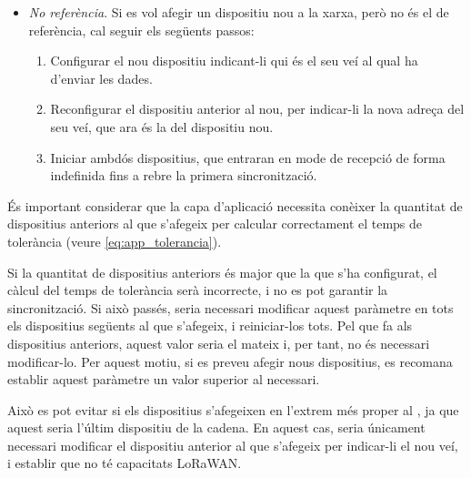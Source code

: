 \documentclass{tfgitic}[2024/07/01]
\begin{document}
{\begin{itemize}
    \item \emph{No referència}. Si es vol afegir un dispositiu nou a la xarxa, però no és el de referència, cal seguir els següents passos:
    \begin{enumerate}
        \item Configurar el nou dispositiu indicant-li qui és el seu veí al qual ha d'enviar les dades.
        \item Reconfigurar el dispositiu anterior al nou, per indicar-li la nova adreça del seu veí, que ara és la del dispositiu nou. 
        \item Iniciar ambdós dispositius, que entraran en mode de recepció de forma indefinida fins a rebre la primera sincronització. 
    \end{enumerate}
\end{itemize}

És important considerar que la capa d'aplicació necessita conèixer la quantitat de dispositius anteriors al que s'afegeix per calcular correctament el temps de tolerància (veure \autoref{eq:app_tolerancia}). 

Si la quantitat de dispositius anteriors és major que la que s'ha configurat, el càlcul del temps de tolerància serà incorrecte, i no es pot garantir la sincronització. Si això passés, seria necessari modificar aquest paràmetre en tots els dispositius següents al que s'afegeix, i reiniciar-los tots. Pel que fa als dispositius anteriors, aquest valor seria el mateix i, per tant, no és necessari modificar-lo. Per aquest motiu, si es preveu afegir nous dispositius, es recomana establir aquest paràmetre un valor superior al necessari.

Això es pot evitar si els dispositius s'afegeixen en l'extrem més proper al , ja que aquest seria l'últim dispositiu de la cadena. En aquest cas, seria únicament necessari modificar el dispositiu anterior al que s'afegeix per indicar-li el nou veí, i establir que no té capacitats LoRaWAN.

}
\end{document}

